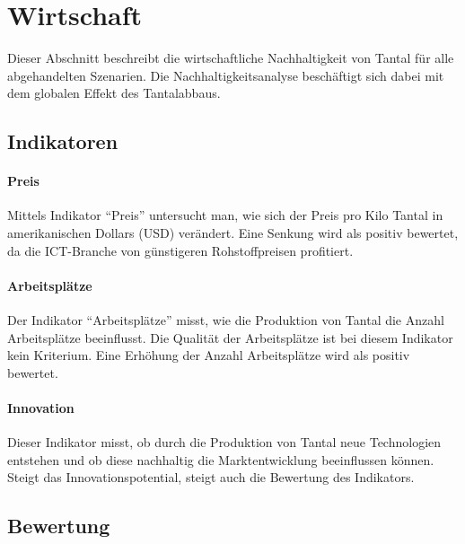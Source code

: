 
\section{Wirtschaft}\label{sec:conflict}

Dieser Abschnitt beschreibt die wirtschaftliche Nachhaltigkeit von Tantal für alle abgehandelten Szenarien. Die Nachhaltigkeitsanalyse beschäftigt sich dabei mit dem globalen Effekt des Tantalabbaus.

\subsection{Indikatoren}

\paragraph{Preis}
Mittels Indikator ``Preis'' untersucht man, wie sich der Preis pro Kilo Tantal
in amerikanischen Dollars (USD) verändert. Eine Senkung wird als positiv bewertet, da die ICT-Branche von günstigeren Rohstoffpreisen profitiert. 

\paragraph{Arbeitsplätze}
Der Indikator ``Arbeitsplätze'' misst, wie die Produktion von Tantal die Anzahl
Arbeitsplätze beeinflusst. Die Qualität der Arbeitsplätze ist bei diesem Indikator kein Kriterium. Eine Erhöhung der Anzahl Arbeitsplätze wird als positiv bewertet.

\paragraph{Innovation}
Dieser Indikator misst, ob durch die Produktion von Tantal neue Technologien
entstehen und ob diese nachhaltig die Marktentwicklung beeinflussen können. Steigt das Innovationspotential, steigt auch die Bewertung des Indikators.

\subsection{Bewertung}

